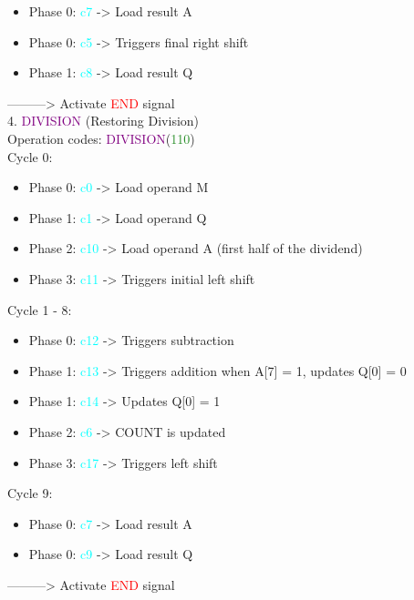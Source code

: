 \documentclass[12pt, letterpaper]{article}
\begin{document}
\begin{itemize} \item Phase 0: \textcolor{cyan}{c7} -> Load result A \item Phase 0: \textcolor{cyan}{c5} -> Triggers final right shift \item Phase 1: \textcolor{cyan}{c8} -> Load result Q \end{itemize} ---------> Activate \textcolor{red}{END} signal\\

4. \textcolor{purple}{DIVISION} (Restoring Division)\\

Operation codes: \textcolor{purple}{DIVISION}(\textcolor{ForestGreen}{110})\\

Cycle 0:

\begin{itemize} \item Phase 0: \textcolor{cyan}{c0} -> Load operand M \item Phase 1: \textcolor{cyan}{c1} -> Load operand Q \item Phase 2: \textcolor{cyan}{c10} -> Load operand A (first half of the dividend) \item Phase 3: \textcolor{cyan}{c11} -> Triggers initial left shift \end{itemize}

Cycle 1 - 8:

\begin{itemize} \item Phase 0: \textcolor{cyan}{c12} -> Triggers subtraction \item Phase 1: \textcolor{cyan}{c13} -> Triggers addition when A[7] = 1, updates Q[0] = 0 \item Phase 1: \textcolor{cyan}{c14} -> Updates Q[0] = 1 \item Phase 2: \textcolor{cyan}{c6} -> COUNT is updated \item Phase 3: \textcolor{cyan}{c17} -> Triggers left shift \end{itemize}

Cycle 9:

\begin{itemize} \item Phase 0: \textcolor{cyan}{c7} -> Load result A \item Phase 0: \textcolor{cyan}{c9} -> Load result Q \end{itemize} ---------> Activate \textcolor{red}{END} signal\\
\end{document}

